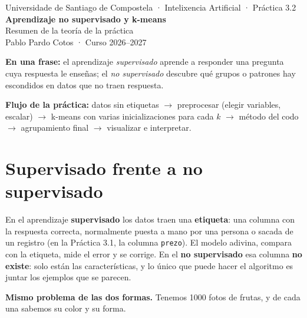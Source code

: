 \documentclass[a4paper,11pt]{article}
\begin{document}
\begin{center}
  {\small Universidade de Santiago de Compostela · Intelixencia Artificial · Práctica 3.2}\\[6pt]
  {\LARGE\bfseries Aprendizaje no supervisado y k-means}\\[4pt]
  {\large Resumen de la teoría de la práctica}\\[4pt]
  {\small Pablo Pardo Cotos · Curso 2026--2027}
\end{center}
\vspace{4pt}

\begin{idea}
\textbf{En una frase:} el aprendizaje \emph{supervisado} aprende a responder una pregunta cuya respuesta le enseñas;
el \emph{no supervisado} descubre qué grupos o patrones hay escondidos en datos que no traen respuesta.\par
\textbf{Flujo de la práctica:} datos sin etiquetas $\to$ preprocesar (elegir variables, escalar) $\to$ k-means con varias
inicializaciones para cada $k$ $\to$ método del codo $\to$ agrupamiento final $\to$ visualizar e interpretar.
\end{idea}

\section{Supervisado frente a no supervisado}

En el aprendizaje \textbf{supervisado} los datos traen una \textbf{etiqueta}: una columna con la respuesta correcta,
normalmente puesta a mano por una persona o sacada de un registro (en la Práctica 3.1, la columna \texttt{prezo}).
El modelo adivina, compara con la etiqueta, mide el error y se corrige.
En el \textbf{no supervisado} esa columna \textbf{no existe}: solo están las características, y lo único que puede
hacer el algoritmo es juntar los ejemplos que se parecen.

\textbf{Mismo problema de las dos formas.} Tenemos 1000 fotos de frutas, y de cada una sabemos su color y su forma.
\end{document}
